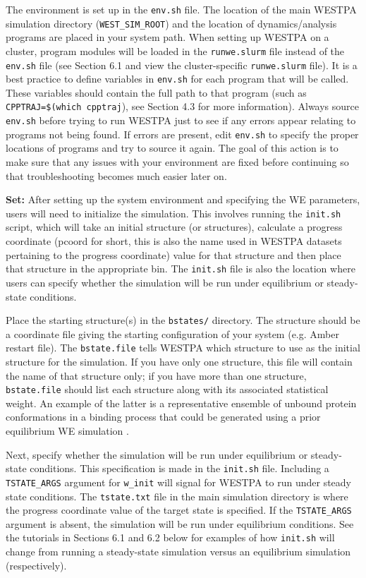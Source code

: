 \documentclass[9pt,tutorial,ASAPversion]{livecoms}
\begin{document}
The environment is set up in the \verb|env.sh| file. 
The location of the main WESTPA simulation directory (\verb|WEST_SIM_ROOT|) and the location of dynamics/analysis programs are placed in your system path. 
When setting up WESTPA on a cluster, program modules will be loaded in the \verb|runwe.slurm| file instead of the \verb|env.sh| file (see Section 6.1 and view the cluster-specific \verb|runwe.slurm| file). 
It is a best practice to define variables in \verb|env.sh| for each program that will be called. 
These variables should contain the full path to that program (such as \verb|CPPTRAJ=$(which cpptraj|), see Section 4.3 for more information). 
Always source \verb|env.sh| before trying to run WESTPA just to see if any errors appear relating to programs not being found. 
If errors are present, edit \verb|env.sh| to specify the proper locations of programs and try to source it again. 
The goal of this action is to make sure that any issues with your environment are fixed before continuing so that troubleshooting becomes much easier later on. 

\textbf{Set:} After setting up the system environment and specifying the WE parameters, users will need to initialize the simulation. 
This involves running the \verb|init.sh| script, which will take an initial structure (or structures), calculate a progress coordinate (pcoord for short, this is also the name used in WESTPA datasets pertaining to the progress coordinate) value for that structure and then place that structure in the appropriate bin. 
The \verb|init.sh| file is also the location where users can specify whether the simulation will be run under equilibrium or steady-state conditions. 

Place the starting structure(s) in the \verb|bstates/| directory. 
The structure should be a coordinate file giving the starting configuration of your system (e.g. Amber restart file). 
The \verb|bstate.file| tells WESTPA which structure to use as the initial structure for the simulation. 
If you have only one structure, this file will contain the name of that structure only; if you have more than one structure, \verb|bstate.file| should list each structure along with its associated statistical weight. 
An example of the latter is a representative ensemble of unbound protein conformations in a binding process that could be generated using a prior equilibrium WE simulation \citep{Zwier2016,Saglam2019}. 

Next, specify whether the simulation will be run under equilibrium or steady-state conditions. 
This specification is made in the \verb|init.sh| file. 
Including a \verb|TSTATE_ARGS| argument for \verb|w_init| will signal for WESTPA to run under steady state conditions. 
The \verb|tstate.txt| file in the main simulation directory is where the progress coordinate value of the target state is specified. 
If the \verb|TSTATE_ARGS| argument is absent, the simulation will be run under equilibrium conditions. 
See the tutorials in Sections 6.1 and 6.2 below for examples of how \verb|init.sh| will change from running a steady-state simulation versus an equilibrium simulation (respectively).
\end{document}
